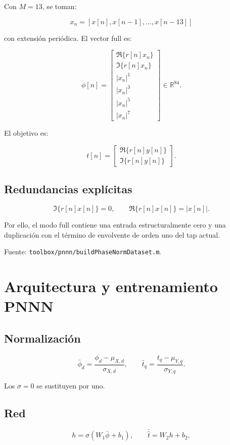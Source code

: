 \documentclass[10pt,a4paper]{article}
\newcommand{\code}[1]{\texttt{#1}}
\newcommand{\R}{\mathbb{R}}
\begin{document}
Con \(M=13\), se toman:

\[
x_n=[x[n],x[n-1],\ldots,x[n-13]]
\]

con extensión periódica. El vector full es:

\[
\phi[n]=
\begin{bmatrix}
\Re\{r[n]x_n\}\\
\Im\{r[n]x_n\}\\
|x_n|^1\\
|x_n|^3\\
|x_n|^5\\
|x_n|^7
\end{bmatrix}
\in\R^{84}.
\]

El objetivo es:

\[
t[n]=
\begin{bmatrix}
\Re\{r[n]y[n]\}\\
\Im\{r[n]y[n]\}
\end{bmatrix}.
\]

\subsection{Redundancias explícitas}

\[
\Im\{r[n]x[n]\}=0,
\qquad
\Re\{r[n]x[n]\}=|x[n]|.
\]

Por ello, el modo full contiene una entrada estructuralmente cero y una
duplicación con el término de envolvente de orden uno del tap actual.

Fuente:
\code{toolbox/pnnn/buildPhaseNormDataset.m}.

\section{Arquitectura y entrenamiento PNNN}

\subsection{Normalización}

\[
\bar\phi_d=\frac{\phi_d-\mu_{X,d}}{\sigma_{X,d}},
\qquad
\bar t_q=\frac{t_q-\mu_{Y,q}}{\sigma_{Y,q}}.
\]

Los \(\sigma=0\) se sustituyen por uno.

\subsection{Red}

\[
h=\sigma(W_1\bar\phi+b_1),
\qquad
\bar{\hat t}=W_2h+b_2,
\]
\end{document}

